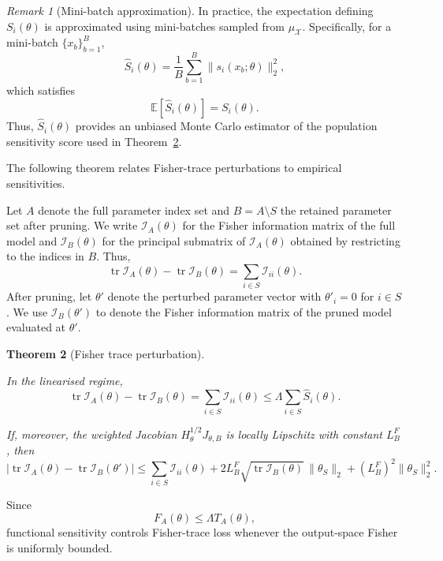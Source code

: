 \documentclass{article}
\newtheorem{theorem}{Theorem}
\theoremstyle{definition}
\theoremstyle{remark}
\newtheorem{remark}[theorem]{Remark}
\begin{document}
\begin{remark}[Mini-batch approximation]
In practice, the expectation defining $S_i(\theta)$ is approximated using
mini-batches sampled from $\mu_{\mathcal X}$. Specifically, for a mini-batch
$\{x_b\}_{b=1}^B$,
\[
\widehat S_i(\theta)
=
\frac1B
\sum_{b=1}^B
\|s_i(x_b;\theta)\|_2^2,
\]
which satisfies
\[
\mathbb E[\widehat S_i(\theta)]
=
S_i(\theta).
\]
Thus, $\widehat S_i(\theta)$ provides an unbiased Monte Carlo estimator of the
population sensitivity score used in Theorem~\ref{thm:fisher_trace}.
\end{remark}

The following theorem relates Fisher-trace perturbations to empirical
sensitivities.

Let \(A\) denote the full parameter index set and \(B=A\setminus S\) the retained parameter set after pruning. We write
\(\mathcal I_A(\theta)\) for the Fisher information matrix of the full model and
\(\mathcal I_B(\theta)\) for the principal submatrix of
\(\mathcal I_A(\theta)\) obtained by restricting to the indices in \(B\). Thus,
\[
\operatorname{tr}\mathcal I_A(\theta)
-
\operatorname{tr}\mathcal I_B(\theta)
=
\sum_{i\in S}\mathcal I_{ii}(\theta).
\]
After pruning, let \(\theta'\) denote the perturbed parameter vector with
\(\theta'_i=0\) for \(i\in S\). We use
\(\mathcal I_B(\theta')\) to denote the Fisher information matrix of the pruned model evaluated at \(\theta'\).


\begin{theorem}[Fisher trace perturbation]
\label{thm:fisher_trace}

In the linearised regime,
\[
\operatorname{tr}\mathcal I_A(\theta)
-
\operatorname{tr}\mathcal I_B(\theta)
=
\sum_{i\in S}\mathcal I_{ii}(\theta)
\le
\Lambda
\sum_{i\in S}\widehat S_i(\theta).
\]

If, moreover, the weighted Jacobian
\(H_\theta^{1/2}J_{\theta,B}\)
is locally Lipschitz with constant \(L_B^F\), then
\[
\left|
\operatorname{tr}\mathcal I_A(\theta)
-
\operatorname{tr}\mathcal I_B(\theta')
\right|
\le
\sum_{i\in S}\mathcal I_{ii}(\theta)
+
2L_B^F
\sqrt{\operatorname{tr}\mathcal I_B(\theta)}
\,
\|\theta_S\|_2
+
(L_B^F)^2
\|\theta_S\|_2^2 .
\]

\end{theorem}

Since
\[
F_A(\theta)\le\Lambda T_A(\theta),
\]
functional sensitivity controls Fisher-trace loss whenever the output-space Fisher is uniformly bounded.
\end{document}
